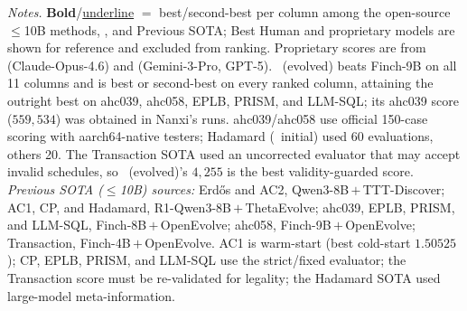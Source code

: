 \begin{table}[!t]
\vspace{3pt}
\begin{flushleft}
\footnotesize
\textit{Notes.} \textbf{Bold}/\underline{underline} $=$ best/second-best per
column among the open-source $\leq$10B methods, \method, and Previous SOTA; Best
Human and proprietary models are shown for reference and excluded from ranking.
Proprietary scores are from \citep{qu2026coral} (Claude-Opus-4.6) and
\citep{liu2026evox} (Gemini-3-Pro, GPT-5). \method~(evolved) beats Finch-9B on all
11 columns and is best or second-best on every ranked column, attaining the
outright best on ahc039, ahc058, EPLB, PRISM, and LLM-SQL; its ahc039 score
($559{,}534$) was obtained in Nanxi's runs. ahc039/ahc058 use official 150-case
scoring with aarch64-native testers; Hadamard (\method~initial) used 60
evaluations, others 20. The Transaction SOTA used an uncorrected evaluator that
may accept invalid schedules, so \method~(evolved)'s $4{,}255$ is the best
validity-guarded score.
\textit{Previous SOTA ($\leq$10B) sources:} Erd\H{o}s and AC2, Qwen3-8B\,$+$\,TTT-Discover;
AC1, CP, and Hadamard, R1-Qwen3-8B\,$+$\,ThetaEvolve; ahc039, EPLB, PRISM, and
LLM-SQL, Finch-8B\,$+$\,OpenEvolve; ahc058, Finch-9B\,$+$\,OpenEvolve; Transaction,
Finch-4B\,$+$\,OpenEvolve. AC1 is warm-start (best cold-start $1.50525$); CP, EPLB,
PRISM, and LLM-SQL use the strict/fixed evaluator; the Transaction score must be
re-validated for legality; the Hadamard SOTA used large-model meta-information.
\end{flushleft}
\end{table}

